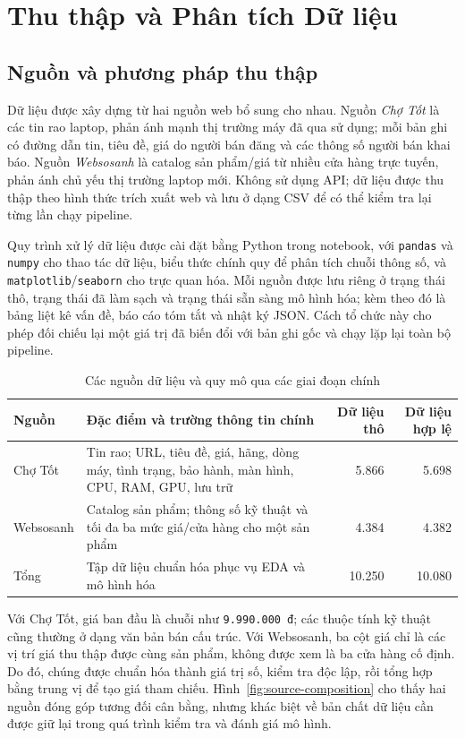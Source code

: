 \section{Thu thập và Phân tích Dữ liệu}

\subsection{Nguồn và phương pháp thu thập}

Dữ liệu được xây dựng từ hai nguồn web bổ sung cho nhau. Nguồn \textit{Chợ Tốt} là các tin rao laptop, phản ánh mạnh thị trường máy đã qua sử dụng; mỗi bản ghi có đường dẫn tin, tiêu đề, giá do người bán đăng và các thông số người bán khai báo. Nguồn \textit{Websosanh} là catalog sản phẩm/giá từ nhiều cửa hàng trực tuyến, phản ánh chủ yếu thị trường laptop mới. Không sử dụng API; dữ liệu được thu thập theo hình thức trích xuất web và lưu ở dạng CSV để có thể kiểm tra lại từng lần chạy pipeline.

Quy trình xử lý dữ liệu được cài đặt bằng Python trong notebook, với \texttt{pandas} và \texttt{numpy} cho thao tác dữ liệu, biểu thức chính quy để phân tích chuỗi thông số, và \texttt{matplotlib}/\texttt{seaborn} cho trực quan hóa. Mỗi nguồn được lưu riêng ở trạng thái thô, trạng thái đã làm sạch và trạng thái sẵn sàng mô hình hóa; kèm theo đó là bảng liệt kê vấn đề, báo cáo tóm tắt và nhật ký JSON. Cách tổ chức này cho phép đối chiếu lại một giá trị đã biến đổi với bản ghi gốc và chạy lặp lại toàn bộ pipeline.

\begin{table}[H]
\centering
\caption{Các nguồn dữ liệu và quy mô qua các giai đoạn chính}
\label{tab:data-sources}
\begin{tabular}{p{2.4cm}p{4.5cm}r r}
\toprule
Nguồn & Đặc điểm và trường thông tin chính & Dữ liệu thô & Dữ liệu hợp lệ \\
\midrule
Chợ Tốt & Tin rao; URL, tiêu đề, giá, hãng, dòng máy, tình trạng, bảo hành, màn hình, CPU, RAM, GPU, lưu trữ & 5.866 & 5.698 \\
Websosanh & Catalog sản phẩm; thông số kỹ thuật và tối đa ba mức giá/cửa hàng cho một sản phẩm & 4.384 & 4.382 \\
\midrule
Tổng & Tập dữ liệu chuẩn hóa phục vụ EDA và mô hình hóa & 10.250 & 10.080 \\
\bottomrule
\end{tabular}
\end{table}

Với Chợ Tốt, giá ban đầu là chuỗi như \texttt{9.990.000 đ}; các thuộc tính kỹ thuật cũng thường ở dạng văn bản bán cấu trúc. Với Websosanh, ba cột giá chỉ là các vị trí giá thu thập được cùng sản phẩm, không được xem là ba cửa hàng cố định. Do đó, chúng được chuẩn hóa thành giá trị số, kiểm tra độc lập, rồi tổng hợp bằng trung vị để tạo giá tham chiếu. Hình~\ref{fig:source-composition} cho thấy hai nguồn đóng góp tương đối cân bằng, nhưng khác biệt về bản chất dữ liệu cần được giữ lại trong quá trình kiểm tra và đánh giá mô hình.

